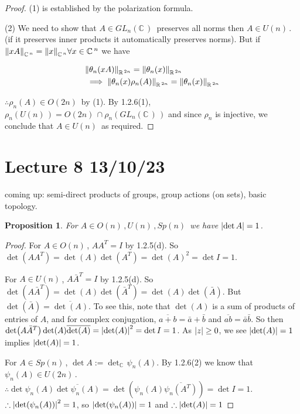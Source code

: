 \documentclass[12pt,a4paper]{article}
\newcommand{\rR}{\ensuremath{\mathbb{R}\,}}
\newcommand{\cC}{\ensuremath{\mathbb{C}\,}}
\newcommand{\glnc}{\ensuremath{GL_n(\cC)\,}}
\newcommand{\gon}{\ensuremath{O(n)\,}}
\newcommand{\gun}{\ensuremath{U(n)\,}}
\newcommand{\gspn}{\ensuremath{Sp(n)\,}}
\newcommand{\gok}[1]{\ensuremath{O(#1)\,}}
\newcommand{\guk}[1]{\ensuremath{U(#1)\,}}
\newcommand{\ol}[1]{\overline{#1}}
\newtheorem{prop}[thm]{Proposition}
\begin{document}
\begin{proof}
(1) is established by the polarization formula.

(2) We need to show that $A\in \glnc$ preserves all norms then $A\in \gun$. (if it preserves inner products it automatically preserves norms). But if $\norm{xA}_{\cC^{n}}=\norm{x}_{\cC^{n}} \forall x\in \cC^n$ we have

\begin{align*}
&\norm{\theta_n(xA)}_{\rR^{2n}}=\norm{\theta_n(x)}_{\rR^{2n}}\\
&\implies \norm{\theta_n(x)\rho_n(A)}_{\rR^{2n}}=\norm{\theta_n(x)}_{\rR^{2n}}\\
\end{align*}

$\therefore \rho_n (A)\in \gok{2n}$ by (1). By 1.2.6(1), $\rho_n(\gun)=\gok{2n}\cap \rho_n(\glnc)$ and since $\rho_n$ is injective, we conclude that $A\in \gun$ as required. 

\end{proof}

\section{Lecture 8 13/10/23}

coming up: semi-direct products of groups, group actions (on sets), basic topology.


\begin{prop}
For $A\in \gon, \gun, \gspn$ we have $\abs{\det A}=1$.
\end{prop}

\begin{proof}
For $A\in \gon$, $AA^T=I$ by 1.2.5(d). So $\det(AA^T)=\det(A)\det(A^T)=\det(A)^2=\det I =1$.

For $A\in \gun$, $A\bar{A}^T=I$ by 1.2.5(d). So $\det(A\bar{A}^T)=\det(A)\det(\bar{A}^T)=\det(A)\det(\bar{A})$. But $\det(\bar{A})=\ol{\det(A)}$. To see this, note that $\det(A)$ is a sum of products of entries of $A$, and for complex conjugation, $\ol{a+b}=\bar{a}+\bar{b}$ and $\ol{ab}=\bar{a}\bar{b}$. So then  $\det(A\bar{A}^T)\det(A)\ol{\det(A)}=\abs{\det(A)}^2=\det I =1$. As $\abs{z}\geq 0$, we see $\abs{\det(A)}=1$ implies $\abs{\det(A)}=1$.

For $A\in \gspn$, $\det A:=\det_{\cC} \psi_n(A)$. By 1.2.6(2) we know that $\psi_{n}(A)\in \guk{2n}$. $\therefore \det \psi_n(A)\ol{\det \psi_n(A)}=\det (\psi_n(A)\ol{ \psi_n(A^T)})=\det I=1$. $\therefore \abs{\det(\psi_n(A))}^2=1$, so $\abs{\det(\psi_n(A))}=1$ and $\therefore \abs{\det(A)}=1$
\end{proof}
\end{document}
